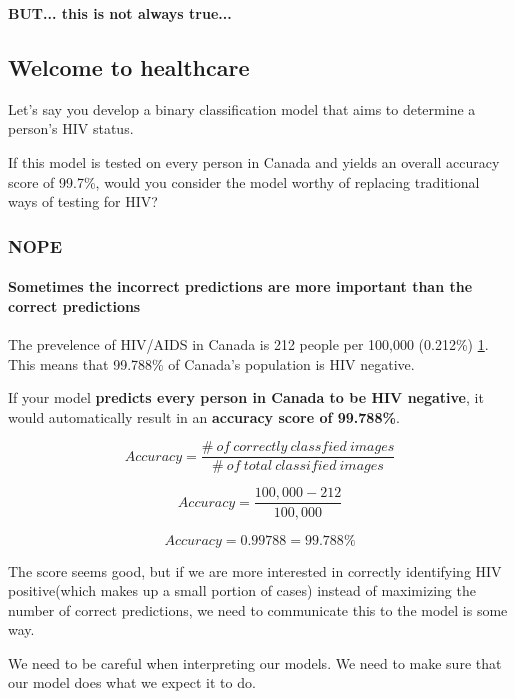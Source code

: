 \documentclass[11pt]{article}
\begin{document}
\textbf{BUT... this is not always true...}

    \subsection{Welcome to healthcare}\label{welcome-to-healthcare}

Let's say you develop a binary classification model that aims to
determine a person's HIV status.

If this model is tested on every person in Canada and yields an overall
accuracy score of 99.7\%, would you consider the model worthy of
replacing traditional ways of testing for HIV?

\subsubsection{\texorpdfstring{\textbf{NOPE}}{NOPE}}\label{nope}

\paragraph{\texorpdfstring{\textbf{Sometimes the incorrect predictions
are more important than the correct
predictions}}{Sometimes the incorrect predictions are more important than the correct predictions}}\label{sometimes-the-incorrect-predictions-are-more-important-than-the-correct-predictions}

The prevelence of HIV/AIDS in Canada is 212 people per 100,000 (0.212\%)
\href{https://en.wikipedia.org/wiki/HIV/AIDS_in_Canada}{1}. This means
that 99.788\% of Canada's population is HIV negative.

If your model \textbf{predicts every person in Canada to be HIV
negative}, it would automatically result in an \textbf{accuracy score of
99.788\%}.

\[Accuracy = \frac{\#\ of\ correctly\ classfied\ images}{\#\ of\ total\ classified\ images}\]

\[Accuracy = \frac{100,000-212}{100,000}\]

\[Accuracy = 0.99788=99.788\%\]

The score seems good, but if we are more interested in correctly
identifying HIV positive(which makes up a small portion of cases)
instead of maximizing the number of correct predictions, we need to
communicate this to the model is some way.

We need to be careful when interpreting our models. We need to make sure
that our model does what we expect it to do.
\end{document}
